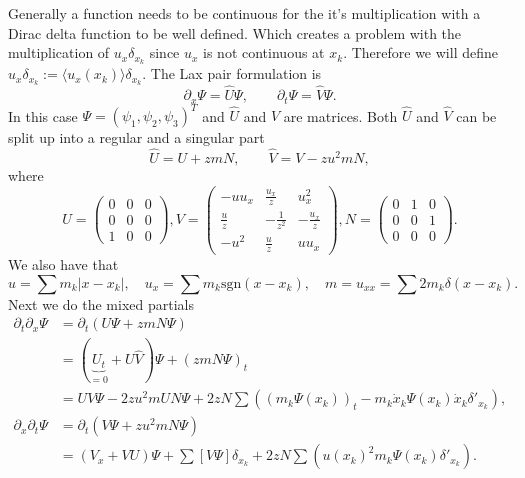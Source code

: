 \documentclass[english,master]{liumaiex}
\theoremstyle{plain}
\theoremstyle{definition}
\newcommand{\sgn}{\text{sgn}}
\begin{document}
Generally a function needs to be continuous for the it's multiplication with a Dirac delta function to be well defined. Which creates a problem with the multiplication of $u_x \delta_{x_k}$ since $u_x$ is not continuous at $x_k$. Therefore we will define $u_x \delta_{x_k} := \langle u_x(x_k) \rangle \delta_{x_k}$. The Lax pair formulation is
\begin{equation}
	\partial_x \Psi = \hat{U} \Psi, \qquad \partial_t \Psi = \hat{V} \Psi.
\end{equation}
In this case $\Psi = (\psi_1, \psi_2, \psi_3)^T$ and $\hat{U}$ and $\hat{V}$ are matrices. Both $\hat{U}$ and $\hat{V}$ can be split up into a regular and a singular part
%
\begin{equation}
\hat{U} = U + zmN, \qquad \hat{V} = V - zu^2mN,
\end{equation}
where
\begin{equation}
U =
	\begin{pmatrix}
	0 & 0 & 0 \\
	0 & 0 & 0 \\
	1 & 0 & 0
	\end{pmatrix},
V = 
	\begin{pmatrix}
	-u u_x & \frac{u_x}{z} & u_x^2 \\
	\frac{u}{z} & - \frac{1}{z^2} & - \frac{u_x}{z} \\
	-u^2 & \frac{u}{z} & uu_x
	\end{pmatrix},
N =
	\begin{pmatrix}
	0 & 1 & 0 \\
	0 & 0 & 1 \\
	0 & 0 & 0
	\end{pmatrix}.
\end{equation}
%
We also have that
\begin{equation}
	u = \sum m_k |x - x_k|, \quad u_x = \sum m_k \sgn(x - x_k), \quad m = u_{xx} = \sum 2 m_k \delta(x - x_k).
\end{equation}
Next we do the mixed partials
\begin{equation}
\begin{aligned}
	\partial_t \partial_x \Psi &= \partial_t (U \Psi + zmN \Psi) \\ 
	&= (\underbrace{U_t}_{=0} + U\hat{V}) \Psi + (zm N \Psi)_t \\
	&= UV \Psi - 2zu^2mUN\Psi + 2zN\sum ((m_k \Psi(x_k))_t - m_k \dot{x}_k\Psi(x_k)\dot{x}_k\delta'_{x_k}), \\
	\partial_x \partial_t \Psi &= \partial_t (V \Psi + zu^2mN \Psi) \\
	&= (V_x + VU) \Psi + \sum [ V \Psi ] \delta_{x_k} + 2zN \sum(u(x_k)^2 m_k \Psi(x_k) \delta'_{x_k}).
\end{aligned}
\end{equation}
\end{document}
